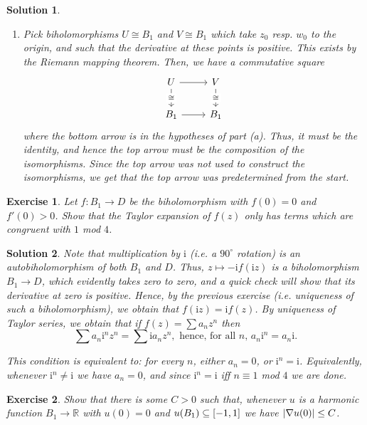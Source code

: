 \documentclass{article}
\newtheorem{ex}{Exercise}
\theoremstyle{nonumberplain}
\newtheorem{sol}{Solution}
\newcommand{\R}{\mathbb{R}}
\newcommand{\I}{\mathrm{i}}
\DeclarePairedDelimiter{\abs}{\lvert}{\rvert}
\begin{document}
\begin{sol}
\begin{enumerate}
\item Pick biholomorphisms $U \cong B_1$ and $V \cong B_1$ which take $z_0$ resp. $w_0$ to the origin, and such that the derivative at these points is positive. This exists by the Riemann mapping theorem. Then, we have a commutative square
\begin{equation}
\begin{tikzcd}
U \arrow[d, "\cong" description] \arrow[r] & V \arrow[d, "\cong" description] \\
B_1 \arrow[r]                              & B_1                             
\end{tikzcd}
\end{equation}
where the bottom arrow is in the hypotheses of part (a). Thus, it must be the identity, and hence the top arrow must be the composition of the isomorphisms. Since the top arrow was not used to construct the isomorphisms, we get that the top arrow was predetermined from the start.
\end{enumerate}
\end{sol}

\begin{ex}
Let $f \colon B_1 \to D$ be the biholomorphism with $f(0) = 0$ and $f'(0) > 0$. Show that the Taylor expansion of $f(z)$ only has terms which are congruent with $1$ mod $4$.
\end{ex}

\begin{sol}
Note that multiplication by $\I$ (i.e. a $90^\circ$ rotation) is an autobiholomorphism of both $B_1$ and $D$. Thus, $z \mapsto -\I f(\I z)$ is a biholomorphism $B_1 \to D$, which evidently takes zero to zero, and a quick check will show that its derivative at zero is positive. Hence, by the previous exercise (i.e. uniqueness of such a biholomorphism), we obtain that $f(\I z) = \I f(z)$. By uniqueness of Taylor series, we obtain that if $f(z) = \sum a_n z^n$ then
\begin{equation}
\sum a_n \I^n z^n = \sum \I a_n z^n, \text{ hence, for all $n$, } a_n \I^n = a_n \I.
\end{equation}

This condition is equivalent to: for every $n$, either $a_n = 0$, or $\I^n = \I$. Equivalently, whenever $\I^n \neq \I$ we have $a_n = 0$, and since $\I^n = \I$ iff $n \equiv 1$ mod $4$ we are done.
\end{sol}

\begin{ex}
Show that there is some $C > 0$ such that, whenever $u$ is a harmonic function $B_1 \to \R$ with $u(0) = 0$ and $u(B_1) \subseteq \interval{-1}1$ we have $\abs{\nabla u(0)} \leq C$.
\end{ex}
\end{document}
